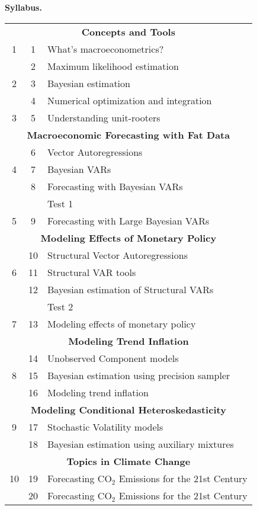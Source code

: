 \documentclass[10pt]{article}
\begin{document}
\begin{multicols}{2}
\noindent\textbf{Syllabus.}
\begin{center}
\begin{tabular}{c c l}
\toprule 
\multicolumn{3}{c}{\textbf{Concepts and Tools}}\\
1 & 1  & What's macroeconometrics? \\
   & 2  & Maximum likelihood estimation  \\
2 & 3  & Bayesian estimation \\
   & 4  & Numerical optimization and integration \\
3 & 5  & Understanding unit-rooters \\[1ex]
\multicolumn{3}{c}{\textbf{Macroeconomic Forecasting with Fat Data}}\\
   & 6  & Vector Autoregressions \\
4 & 7  & Bayesian VARs \\
   & 8  & Forecasting with Bayesian VARs \\
   &    & Test 1 \\
5 & 9  & Forecasting with Large Bayesian VARs \\[1ex]
\multicolumn{3}{c}{\textbf{Modeling Effects of Monetary Policy}}\\
   & 10  & Structural Vector Autoregressions \\
6 & 11  & Structural VAR tools \\
   & 12  & Bayesian estimation of Structural VARs \\
   &    & Test 2 \\
7 & 13  & Modeling effects of monetary policy \\[1ex]
\multicolumn{3}{c}{\textbf{Modeling Trend Inflation}}\\
   & 14  & Unobserved Component models \\
8 & 15  & Bayesian estimation using precision sampler \\
   & 16  & Modeling trend inflation \\[1ex]
\multicolumn{3}{c}{\textbf{Modeling Conditional Heteroskedasticity}}\\
9 & 17  & Stochastic Volatility models \\
   & 18  & Bayesian estimation using auxiliary mixtures \\[1ex]
\multicolumn{3}{c}{\textbf{Topics in Climate Change}}\\
10 & 19  & Forecasting CO$_2$ Emissions for the 21st Century \\
    & 20  & Forecasting CO$_2$ Emissions for the 21st Century \\[1ex]

\end{tabular}
\end{center}
\end{multicols}
\end{document}
